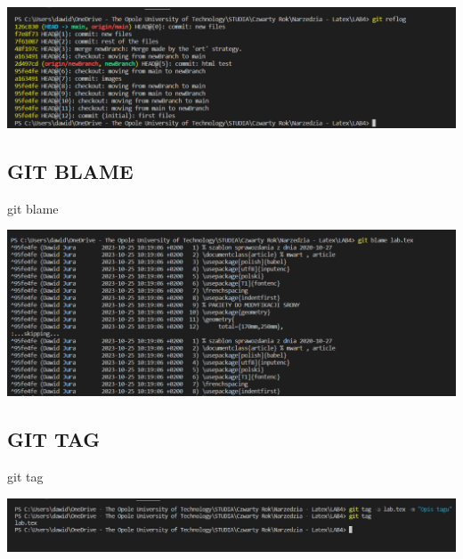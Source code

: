 \documentclass{article} %
\newcommand{\forceindent}{\leavevmode{\parindent=1cm\indent}} %
\begin{document}
\includegraphics[width=18cm]{image/reflog.png}
\subsection{GIT BLAME}
\forceindent git blame

\includegraphics[width=18cm]{image/blame.png}
\subsection{GIT TAG}
\forceindent git tag

\includegraphics[width=18cm]{image/tag.png}
\end{document}
